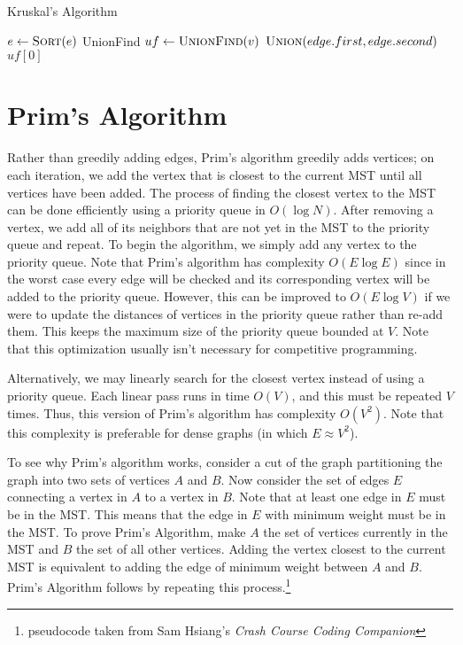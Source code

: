 \documentclass[11pt]{article}
\begin{document}
\begin{algorithm}[H]
\caption{Kruskal's Algorithm}
\begin{algorithmic}
        \State $e \gets \Call{Sort}{e}$
        \State UnionFind $uf \gets \Call{UnionFind}{v}$
                \State $\Call{Union}{edge.first, edge.second}$
            \EndIf
        \EndFor
        \State \Return $uf[0]$
    \EndFunction
\end{algorithmic}
\end{algorithm}

\section{Prim's Algorithm}

Rather than greedily adding edges, Prim's algorithm greedily adds vertices; on each iteration, we add the vertex that is closest to the current MST until all vertices have been added. The process of finding the closest vertex to the MST can be done efficiently using a priority queue in $O(\log N)$. After removing a vertex, we add all of its neighbors that are not yet in the MST to the priority queue and repeat. To begin the algorithm, we simply add any vertex to the priority queue. Note that Prim's algorithm has complexity $O(E \log E)$ since in the worst case every edge will be checked and its corresponding vertex will be added to the priority queue. However, this can be improved to $O(E \log V)$ if we were to update the distances of vertices in the priority queue rather than re-add them. This keeps the maximum size of the priority queue bounded at $V$. Note that this optimization usually isn't necessary for competitive programming. 

Alternatively, we may linearly search for the closest vertex instead of using a priority queue. Each linear pass runs in time $O(V)$, and this must be repeated $V$ times. Thus, this version of Prim's algorithm has complexity $O(V^2)$. Note that this complexity is preferable for dense graphs (in which $E \approx V^2$). 

To see why Prim's algorithm works, consider a cut of the graph partitioning the graph into two sets of vertices $A$ and $B$. Now consider the set of edges $E$ connecting a vertex in $A$ to a vertex in $B$. Note that at least one edge in $E$ must be in the MST. This means that the edge in $E$ with minimum weight must be in the MST. To prove Prim's Algorithm, make $A$ the set of vertices currently in the MST and $B$ the set of all other vertices. Adding the vertex closest to the current MST is equivalent to adding the edge of minimum weight between $A$ and $B$. Prim's Algorithm follows by repeating this process.\footnote {\label{note1}pseudocode taken from Sam Hsiang's \textit{Crash Course Coding Companion}}
\end{document}
